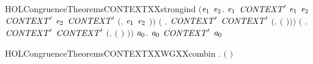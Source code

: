 \begin{SaveVerbatim}{HOLCongruenceTheoremsCONTEXTXXstrongind}
       \ensuremath{(}\HOLSymConst{\HOLTokenForall{}}\ensuremath{\HOLBoundVar{e}\sb{\mathrm{1}}} \ensuremath{\HOLBoundVar{e}\sb{\mathrm{2}}}.
             \ensuremath{\HOLBoundVar{e}\sb{\mathrm{1}}} \HOLSymConst{\HOLTokenConj{}} \ensuremath{\HOLBoundVar{CONTEXT}\sp{\prime}} \ensuremath{\HOLBoundVar{e}\sb{\mathrm{1}}} \HOLSymConst{\HOLTokenConj{}}  \ensuremath{\HOLBoundVar{e}\sb{\mathrm{2}}} \HOLSymConst{\HOLTokenConj{}} \ensuremath{\HOLBoundVar{CONTEXT}\sp{\prime}} \ensuremath{\HOLBoundVar{e}\sb{\mathrm{2}}} \HOLSymConst{\HOLTokenImp{}}
            \ensuremath{\HOLBoundVar{CONTEXT}\sp{\prime}} \ensuremath{(}\HOLTokenLambda{}. \ensuremath{\HOLBoundVar{e}\sb{\mathrm{1}}}  \HOLSymConst{\ensuremath{\mid}} \ensuremath{\HOLBoundVar{e}\sb{\mathrm{2}}} \ensuremath{)}\ensuremath{)} \HOLSymConst{\HOLTokenConj{}}
       \ensuremath{(}\HOLSymConst{\HOLTokenForall{}} .   \HOLSymConst{\HOLTokenConj{}} \ensuremath{\HOLBoundVar{CONTEXT}\sp{\prime}}  \HOLSymConst{\HOLTokenImp{}} \ensuremath{\HOLBoundVar{CONTEXT}\sp{\prime}} \ensuremath{(}\HOLTokenLambda{}.   \ensuremath{(} \ensuremath{)}\ensuremath{)}\ensuremath{)} \HOLSymConst{\HOLTokenConj{}}
       \ensuremath{(}\HOLSymConst{\HOLTokenForall{}} .
              \HOLSymConst{\HOLTokenConj{}} \ensuremath{\HOLBoundVar{CONTEXT}\sp{\prime}}  \HOLSymConst{\HOLTokenImp{}}
            \ensuremath{\HOLBoundVar{CONTEXT}\sp{\prime}} \ensuremath{(}\HOLTokenLambda{}.  \ensuremath{(} \ensuremath{)} \ensuremath{)}\ensuremath{)} \HOLSymConst{\HOLTokenImp{}}
       \HOLSymConst{\HOLTokenForall{}}\ensuremath{\HOLBoundVar{a}\sb{\mathrm{0}}}.  \ensuremath{\HOLBoundVar{a}\sb{\mathrm{0}}} \HOLSymConst{\HOLTokenImp{}} \ensuremath{\HOLBoundVar{CONTEXT}\sp{\prime}} \ensuremath{\HOLBoundVar{a}\sb{\mathrm{0}}}
\end{SaveVerbatim}
\newcommand{\HOLCongruenceTheoremsCONTEXTXXstrongind}{\UseVerbatim{HOLCongruenceTheoremsCONTEXTXXstrongind}}
\begin{SaveVerbatim}{HOLCongruenceTheoremsCONTEXTXXWGXXcombin}
\HOLTokenTurnstile{} \HOLSymConst{\HOLTokenForall{}} .   \HOLSymConst{\HOLTokenConj{}}   \HOLSymConst{\HOLTokenImp{}}  \ensuremath{(} \HOLConst{\HOLTokenCompose} \ensuremath{)}
\end{SaveVerbatim}

